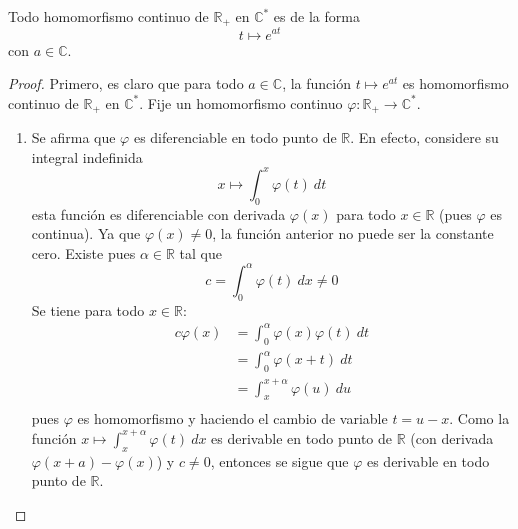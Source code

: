 \documentclass[12pt]{report}
\newcounter{it}
\theoremstyle{largebreak}
\newcommand\cf[3]{\ensuremath{#1:#2\rightarrow#3}}
\begin{document}
    \begin{propo}
        Todo homomorfismo continuo de $\mathbb{R}_+$ en $\mathbb{C}^*$ es de la forma
        \begin{equation*}
            t\mapsto e^{ at}
        \end{equation*}
        con $a\in\mathbb{C}$.
    \end{propo}

    \begin{proof}
        Primero, es claro que para todo $a\in\mathbb{C}$, la función $t\mapsto e^{at}$ es homomorfismo continuo de $\mathbb{R}_+$ en $\mathbb{C}^*$. Fije un homomorfismo continuo $\cf{\varphi}{\mathbb{R}_+}{\mathbb{C}^*}$.
        \begin{enumerate}
            \item Se afirma que $\varphi$ es diferenciable en todo punto de $\mathbb{R}$. En efecto, considere su integral indefinida
            \begin{equation*}
                x\mapsto \int_{0}^x \varphi(t)\:dt
            \end{equation*}
            esta función es diferenciable con derivada $\varphi(x)$ para todo $x\in\mathbb{R}$ (pues $\varphi$ es continua). Ya que $\varphi(x)\neq0$, la función anterior no puede ser la constante cero. Existe pues $\alpha\in\mathbb{R}$ tal que
            \begin{equation*}
                c=\int_0^\alpha\varphi(t)\:dx\neq0
            \end{equation*}
            Se tiene para todo $x\in\mathbb{R}$:
            \begin{equation*}
                \begin{split}
                    c\varphi(x)&=\int_0^{\alpha}\varphi(x)\varphi(t)\:dt\\
                    &=\int_0^{\alpha}\varphi(x+t)\:dt\\
                    &=\int_x^{x+\alpha}\varphi(u)\:du\\
                \end{split}
            \end{equation*}
            pues $\varphi$ es homomorfismo y haciendo el cambio de variable $t=u-x$. Como la función $x\mapsto \int_{x}^{x+\alpha}\varphi(t)\:dx$ es derivable en todo punto de $\mathbb{R}$ (con derivada $\varphi(x+a)-\varphi(x)$) y $c\neq0$, entonces se sigue que $\varphi$ es derivable en todo punto de $\mathbb{R}$.


\end{enumerate}
\end{proof}
\end{document}
